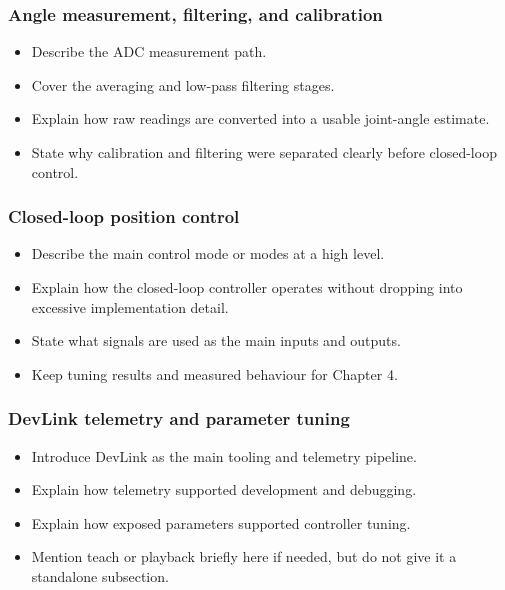 \subsubsection{Angle measurement, filtering, and calibration}
\begin{itemize}[label=\textcolor{red}{\textbullet}, before=\color{red}]
  \item Describe the ADC measurement path.
  \item Cover the averaging and low-pass filtering stages.
  \item Explain how raw readings are converted into a usable joint-angle estimate.
  \item State why calibration and filtering were separated clearly before closed-loop control.
\end{itemize}

\subsubsection{Closed-loop position control}
\begin{itemize}[label=\textcolor{red}{\textbullet}, before=\color{red}]
  \item Describe the main control mode or modes at a high level.
  \item Explain how the closed-loop controller operates without dropping into excessive implementation detail.
  \item State what signals are used as the main inputs and outputs.
  \item Keep tuning results and measured behaviour for Chapter 4.
\end{itemize}

\subsubsection{DevLink telemetry and parameter tuning}
\begin{itemize}[label=\textcolor{red}{\textbullet}, before=\color{red}]
  \item Introduce DevLink as the main tooling and telemetry pipeline.
  \item Explain how telemetry supported development and debugging.
  \item Explain how exposed parameters supported controller tuning.
  \item Mention teach or playback briefly here if needed, but do not give it a standalone subsection.
\end{itemize}

